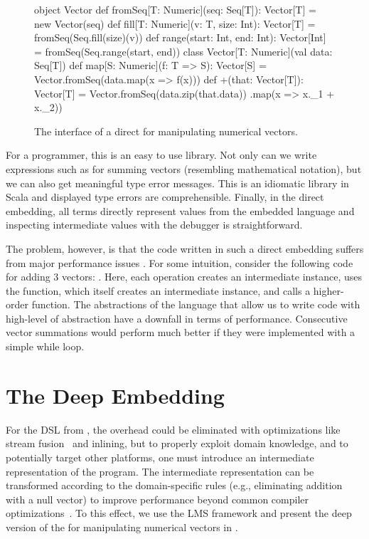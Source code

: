 \begin{figure}
\begin{listingtiny}
object Vector {
  def fromSeq[T: Numeric](seq: Seq[T]): Vector[T] =
    new Vector(seq)
  def fill[T: Numeric](v: T, size: Int): Vector[T] =
    fromSeq(Seq.fill(size)(v))
  def range(start: Int, end: Int): Vector[Int] =
    fromSeq(Seq.range(start, end))
}
class Vector[T: Numeric](val data: Seq[T]) {
  def map[S: Numeric](f: T => S): Vector[S] =
    Vector.fromSeq(data.map(x => f(x)))
  def +(that: Vector[T]): Vector[T] =
    Vector.fromSeq(data.zip(that.data))
      .map(x => x._1 + x._2))
}

\end{listingtiny}
\caption{\label{lst:vector} The interface of a direct \edsl for manipulating numerical vectors.}
\end{figure}

For a programmer, this is an easy to use library. Not only can we write
expressions such as  for summing vectors (resembling mathematical
notation), but we can also get meaningful type error messages. This \edsl is an
idiomatic library in Scala and displayed type errors are comprehensible. Finally, in the
direct embedding, all terms directly represent values from the embedded language
and inspecting intermediate values with the debugger is straightforward.

The problem, however, is that the code written in such a direct embedding suffers from major performance issues \cite{rompf_optimizing_2013}. For some intuition, consider the following code for adding 3 vectors: . Here, each \code{+} operation creates an intermediate  instance, uses the  function, which itself creates an intermediate  instance, and calls a higher-order  function. The abstractions of the language that allow us to write code with high-level of abstraction have a downfall in terms of performance. Consecutive vector summations would perform much better if they were implemented with a simple while loop.



\section{The Deep Embedding}
\label{sec:the-deep-embedding}

For the DSL from , the overhead could be eliminated with
optimizations like stream fusion~\cite{coutts_stream_2007} and inlining, but to
properly exploit domain knowledge, and to potentially target other platforms,
one must introduce an intermediate representation of the \edsl program. The
intermediate representation can be transformed according to the domain-specific rules
 (e.g., eliminating addition with a null vector) to improve performance beyond common compiler
optimizations~\cite{rompf_optimizing_2013}. To this effect, we use the LMS
framework and present the deep version of the \edsl{} for manipulating numerical vectors in
.


